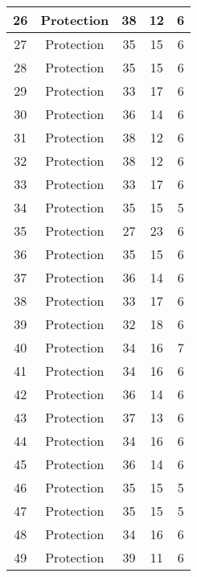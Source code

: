 \documentclass[results.tex]{subfiles}
\begin{document}
\begin{center}
\begin{tabular}{| c || c | c | c | c |}
    \hline
    26 & Protection & 38 & 12 & 6 \\ 
    \hline
    27 & Protection & 35 & 15 & 6 \\ 
    \hline
    28 & Protection & 35 & 15 & 6 \\ 
    \hline
    29 & Protection & 33 & 17 & 6 \\ 
    \hline
    30 & Protection & 36 & 14 & 6 \\ 
    \hline
    31 & Protection & 38 & 12 & 6 \\ 
    \hline
    32 & Protection & 38 & 12 & 6 \\ 
    \hline
    33 & Protection & 33 & 17 & 6 \\ 
    \hline
    34 & Protection & 35 & 15 & 5 \\ 
    \hline
    35 & Protection & 27 & 23 & 6 \\ 
    \hline
    36 & Protection & 35 & 15 & 6 \\ 
    \hline
    37 & Protection & 36 & 14 & 6 \\ 
    \hline
    38 & Protection & 33 & 17 & 6 \\ 
    \hline
    39 & Protection & 32 & 18 & 6 \\ 
    \hline
    40 & Protection & 34 & 16 & 7 \\ 
    \hline
    41 & Protection & 34 & 16 & 6 \\ 
    \hline
    42 & Protection & 36 & 14 & 6 \\ 
    \hline
    43 & Protection & 37 & 13 & 6 \\ 
    \hline
    44 & Protection & 34 & 16 & 6 \\ 
    \hline
    45 & Protection & 36 & 14 & 6 \\ 
    \hline
    46 & Protection & 35 & 15 & 5 \\ 
    \hline
    47 & Protection & 35 & 15 & 5 \\ 
    \hline
    48 & Protection & 34 & 16 & 6 \\ 
    \hline
    49 & Protection & 39 & 11 & 6 \\ 
    \hline   \end{tabular}
\end{center}
\end{document}
